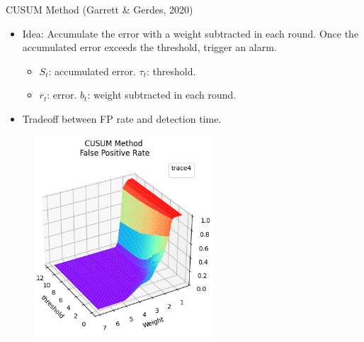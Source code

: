 \documentclass[aspectratio=169, 8pt]{beamer}
\begin{document}
\begin{frame}

\begin{columns}[T]

    \begin{column}{0.5\linewidth}
    
        \begin{block}{CUSUM Method (Garrett \& Gerdes, 2020)}
            \begin{itemize}
                \item Idea: Accumulate the error with a weight subtracted in each round. Once the accumulated error exceeds the threshold, trigger an alarm.
                \begin{itemize}
                    \item $S_t$: accumulated error. $\tau_t$: threshold. \\
                    \item $r_t$: error. $b_t$: weight subtracted in each round.\\
                \end{itemize}
                 \item Tradeoff between FP rate and detection time.
            \end{itemize}
        \end{block}

        \begin{figure}
            \centering
            \includegraphics[width = 0.6\textwidth]{images/Garrett_FP_rate_CUSUM.png}
            \label{fig:enter-label}
        \end{figure}        
        
    \end{column}
    

\end{columns}
\end{frame}
\end{document}
